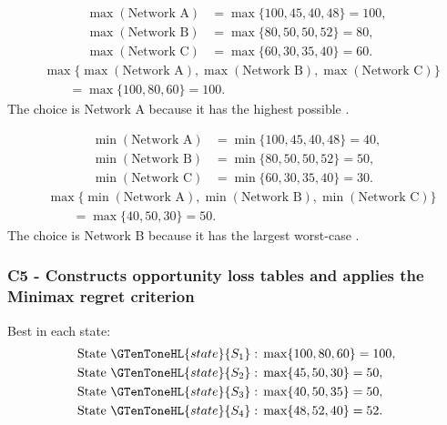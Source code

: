 	\[
	\begin{aligned}
		\max(\text{Network A}) &= \max\{100,45,40,48\}=100,\\
		\max(\text{Network B}) &= \max\{80,50,50,52\}=80,\\
		\max(\text{Network C}) &= \max\{60,30,35,40\}=60.
	\end{aligned}
	\]
	\[
	\begin{aligned}
		&\max\{\max(\text{Network A}),\max(\text{Network B}),
		\max(\text{Network C})\}\\
		&\qquad=\max\{100,80,60\}
		=100.
	\end{aligned}
	\]
	The  choice is Network A because it has the highest possible .
	
	\[
	\begin{aligned}
		\min(\text{Network A}) &= \min\{100,45,40,48\}=40,\\
		\min(\text{Network B}) &= \min\{80,50,50,52\}=50,\\
		\min(\text{Network C}) &= \min\{60,30,35,40\}=30.
	\end{aligned}
	\]
	\[
	\begin{aligned}
		&\max\{\min(\text{Network A}),\min(\text{Network B}),
		\min(\text{Network C})\}\\
		&\qquad=\max\{40,50,30\}
		=50.
	\end{aligned}
	\]
	The  choice is Network B because it has the largest worst-case .
	
	\subsubsection*{C5 - Constructs opportunity loss tables and applies the Minimax regret criterion}
	\label{subsec:service-network-4x3-c5}
	
	Best  in each state:
	\[
	\begin{aligned}
		\text{State }\GTenToneHL{state}{S_1}:\;&\max\{100,80,60\}=100,\\
		\text{State }\GTenToneHL{state}{S_2}:\;&\max\{45,50,30\}=50,\\
		\text{State }\GTenToneHL{state}{S_3}:\;&\max\{40,50,35\}=50,\\
		\text{State }\GTenToneHL{state}{S_4}:\;&\max\{48,52,40\}=52.
	\end{aligned}
	\]
	
